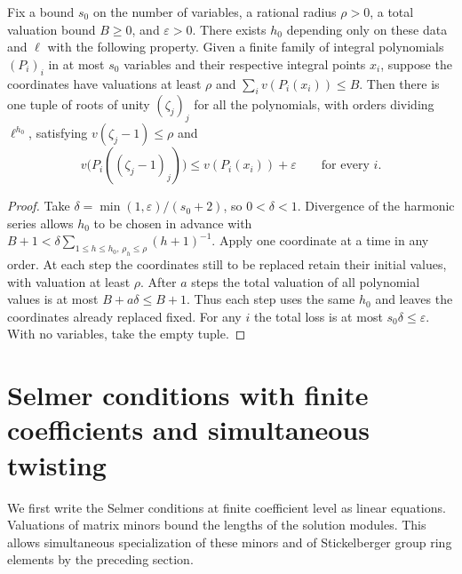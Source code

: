 \begin{lemma}
\label{lem:c-root-simultaneous}
\emitthmsource
Fix a bound $s_0$ on the number of variables, a rational radius $\rho>0$, a total valuation bound $B\ge0$, and $\varepsilon>0$.
There exists $h_0$ depending only on these data and $\ell$ with the following property.
Given a finite family of integral polynomials $(P_i)_i$ in at most $s_0$ variables and their respective integral points $x_i$, suppose the coordinates have valuations at least $\rho$ and $\sum_i v(P_i(x_i))\le B$. Then there is one tuple of roots of unity $(\zeta_j)_j$ for all the polynomials, with orders dividing $\ell^{h_0}$, satisfying $v(\zeta_j-1)\le\rho$ and
\[
 v\bigl(P_i((\zeta_j-1)_j)\bigr)\le v(P_i(x_i))+\varepsilon\qquad\text{for every }i .
\]
\end{lemma}
\begin{proof}
Take $\delta=\min(1,\varepsilon)/(s_0+2)$, so $0<\delta<1$.
Divergence of the harmonic series allows $h_0$ to be chosen in advance with $B+1<\delta\sum_{1\le h\le h_0,\,\rho_h\le\rho}(h+1)^{-1}$.
Apply  one coordinate at a time in any order.
At each step the coordinates still to be replaced retain their initial values, with valuation at least $\rho$. After $a$ steps the total valuation of all polynomial values is at most $B+a\delta\le B+1$. Thus each step uses the same $h_0$ and leaves the coordinates already replaced fixed.
For any $i$ the total loss is at most $s_0\delta\le\varepsilon$.
With no variables, take the empty tuple.
\end{proof}

\section{Selmer conditions with finite coefficients and simultaneous twisting}
\label{sec:c-selmer-synch}

We first write the Selmer conditions at finite coefficient level as linear equations. Valuations of matrix minors bound the lengths of the solution modules. This allows simultaneous specialization of these minors and of Stickelberger group ring elements by the preceding section.

